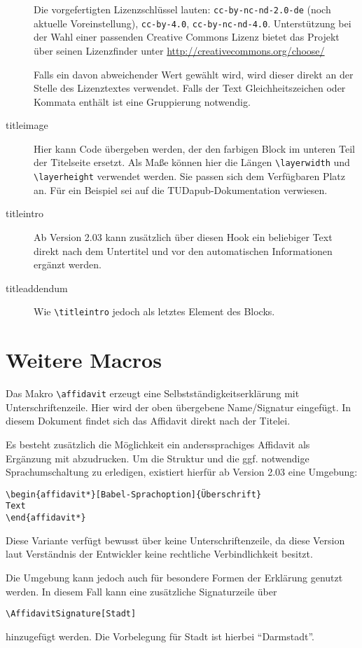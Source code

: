 \documentclass[
	ngerman,
	ruledheaders=chapter,%
	class=book,%
	thesis={
		type=dr,
		dr=rernat
	},
	accentcolor=9c,%
	custommargins=true,%
	marginpar=false,%
	fontsize=11pt,%
]{tudapub}
\let\code\texttt
\let\tbs\textbackslash
\begin{document}
\begin{description}
	Die vorgefertigten Lizenzschlüssel lauten: \verb+cc-by-nc-nd-2.0-de+ (noch aktuelle Voreinstellung), \verb+cc-by-4.0+, \verb+cc-by-nc-nd-4.0+.
	Unterstützung bei der Wahl einer passenden Creative Commons Lizenz bietet das Projekt über seinen Lizenzfinder unter \url{http://creativecommons.org/choose/}

	Falls ein davon abweichender Wert gewählt wird, wird dieser direkt an der Stelle des Lizenztextes verwendet. Falls der Text Gleichheitszeichen oder Kommata enthält ist eine Gruppierung notwendig.
	\item[titleimage] Hier kann Code übergeben werden, der den farbigen Block im unteren Teil der Titelseite ersetzt. Als Maße können hier die Längen \verb+\layerwidth+ und \verb+\layerheight+ verwendet werden. Sie passen sich dem Verfügbaren Platz an. Für ein Beispiel sei auf die TUDapub-Dokumentation verwiesen.
	\item[titleintro] Ab Version 2.03 kann zusätzlich über diesen Hook ein beliebiger Text direkt nach dem Untertitel und vor den automatischen Informationen ergänzt werden.
	\item[titleaddendum] Wie \code{\tbs{}titleintro} jedoch als letztes Element des Blocks.
\end{description}

\section{Weitere Macros}
Das Makro \verb+\affidavit+ erzeugt eine Selbstständigkeitserklärung mit Unterschriftenzeile. Hier wird der oben übergebene Name/Signatur eingefügt.
In diesem Dokument findet sich das Affidavit direkt nach der Titelei.

Es besteht zusätzlich die Möglichkeit ein anderssprachiges Affidavit als Ergänzung mit abzudrucken. Um die Struktur und die ggf. notwendige Sprachumschaltung zu erledigen, existiert hierfür ab Version 2.03 eine Umgebung:

\begin{verbatim}
\begin{affidavit*}[Babel-Sprachoption]{Überschrift}
Text
\end{affidavit*}
\end{verbatim}

Diese Variante verfügt bewusst über keine Unterschriftenzeile, da diese Version laut Verständnis der Entwickler keine rechtliche Verbindlichkeit besitzt.

Die Umgebung kann jedoch auch für besondere Formen der Erklärung genutzt werden. In diesem Fall kann eine zusätzliche Signaturzeile über
\begin{verbatim}
\AffidavitSignature[Stadt]
\end{verbatim}
hinzugefügt werden. Die Vorbelegung für Stadt ist hierbei \enquote{Darmstadt}.
\end{document}
